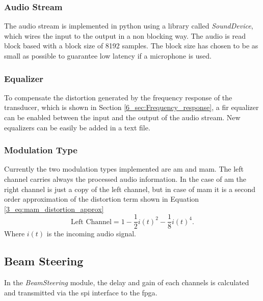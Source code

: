 \subsubsection{Audio Stream}
The audio stream is implemented in python using a library called \textit{SoundDevice}, which wires the input to the output in a non blocking way. The audio is read block based with a block size of 8192 samples. The block size has chosen to be as small as possible to guarantee low latency if a microphone is used. 
\subsubsection{Equalizer}
To compensate the distortion generated by the frequency response of the transducer, which is shown in Section \ref{6_sec:Frequency_response}, a \acrshort{fir} equalizer can be enabled between the input and the output of the audio stream. New equalizers can be easily be added in a text file. 
\subsubsection{Modulation Type}
Currently the two modulation types implemented are \acrshort{am} and \acrshort{mam}.
The left channel carries always the processed audio information.
In the case of \acrshort{am} the right channel is just a copy of the left channel, but in case of \acrshort{mam} it is a second order approximation of the distortion term shown in Equation \ref{3_eq:mam_distortion_approx} 
\begin{equation}
    \text{Left Channel} = 1 - \frac{1}{2}i(t)^2 - \frac{1}{8}i(t)^4.
\end{equation}
Where $i(t)$ is the incoming audio signal. 
\subsection{Beam Steering}
In the \textit{BeamSteering} module, the delay and gain of each channels is calculated and transmitted via the \acrshort{spi} interface to the \acrshort{fpga}. 
